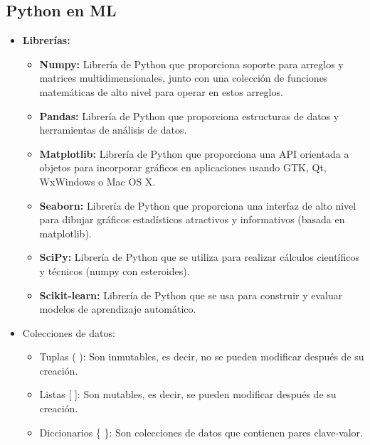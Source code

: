 \documentclass{templateApunte}
\begin{document}
\subsection{Python en ML} \hypertarget{python}{}
\begin{itemize}
  \item \hypertarget{pythonLibrerias}{\textbf{Librerías:}}
  \begin{itemize}
    \item \textbf{Numpy:} Librería de Python que proporciona soporte para arreglos y matrices multidimensionales, junto con una colección de funciones matemáticas de alto nivel para operar en estos arreglos.
    \item \textbf{Pandas:} Librería de Python que proporciona estructuras de datos y herramientas de análisis de datos.
    \item \textbf{Matplotlib:} Librería de Python que proporciona una API orientada a objetos para incorporar gráficos en aplicaciones usando GTK, Qt, WxWindows o Mac OS X.
    \item \textbf{Seaborn:} Librería de Python que proporciona una interfaz de alto nivel para dibujar gráficos estadísticos atractivos y informativos (basada en matplotlib).
    \item \textbf{SciPy:} Librería de Python que se utiliza para realizar cálculos científicos y técnicos (numpy con esteroides).
    \item \textbf{Scikit-learn:} Librería de Python que se usa para construir y evaluar modelos de aprendizaje automático.
  \end{itemize}

  \item Colecciones de datos:
  \begin{itemize}
    \item Tuplas ( ): Son inmutables, es decir, no se pueden modificar después de su creación.
    \item Listas [ ]: Son mutables, es decir, se pueden modificar después de su creación.
    \item Diccionarios \{ \}: Son colecciones de datos que contienen pares clave-valor.
  \end{itemize}


\end{itemize}
\end{document}
